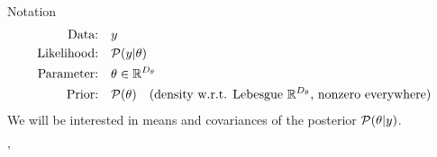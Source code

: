 \documentclass[8pt]{beamer}\usepackage[]{graphicx}\usepackage[]{color}
\begin{document}

\begin{frame}[t]{Notation}
%
\vspace{-2em}
%
\begin{align*}
    \text{Data:}&\quad y \\
    \text{Likelihood:}&\quad\mathcal{P}(y \vert \theta)\\
    \text{Parameter:}& \quad \theta \in \mathbb{R}^{{D_{\theta}}}\\
    \text{Prior:}&\quad \mathcal{P}(\theta) 
        \quad \text{(density w.r.t. Lebesgue $\mathbb{R}^{D_{\theta}}$, 
            nonzero everywhere)}\\
\end{align*}
%
We will be interested in means and covariances of the posterior $\mathcal{P}(\theta \vert y)$.
%

'%


\end{frame}
\end{document}
